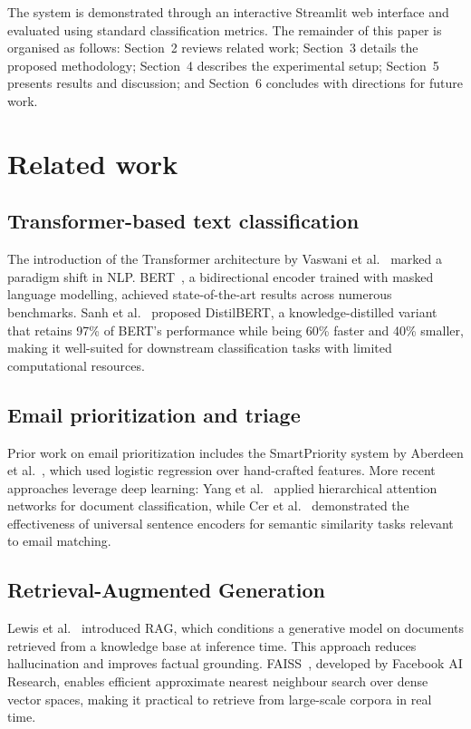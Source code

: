\documentclass[3p,times,procedia]{elsarticle}
\begin{document}
The system is demonstrated through an interactive Streamlit web interface and evaluated using standard classification metrics. The remainder of this paper is organised as follows: Section~2 reviews related work; Section~3 details the proposed methodology; Section~4 describes the experimental setup; Section~5 presents results and discussion; and Section~6 concludes with directions for future work.


\section{Related work}
\label{sec:related}

\subsection{Transformer-based text classification}

The introduction of the Transformer architecture by Vaswani et al.~\cite{vaswani2017} marked a paradigm shift in NLP. BERT~\cite{devlin2019}, a bidirectional encoder trained with masked language modelling, achieved state-of-the-art results across numerous benchmarks. Sanh et al.~\cite{sanh2019} proposed DistilBERT, a knowledge-distilled variant that retains 97\% of BERT's performance while being 60\% faster and 40\% smaller, making it well-suited for downstream classification tasks with limited computational resources.

\subsection{Email prioritization and triage}

Prior work on email prioritization includes the SmartPriority system by Aberdeen et al.~\cite{aberdeen2010}, which used logistic regression over hand-crafted features. More recent approaches leverage deep learning: Yang et al.~\cite{yang2017} applied hierarchical attention networks for document classification, while Cer et al.~\cite{cer2018} demonstrated the effectiveness of universal sentence encoders for semantic similarity tasks relevant to email matching.

\subsection{Retrieval-Augmented Generation}

Lewis et al.~\cite{lewis2020} introduced RAG, which conditions a generative model on documents retrieved from a knowledge base at inference time. This approach reduces hallucination and improves factual grounding. FAISS~\cite{johnson2019}, developed by Facebook AI Research, enables efficient approximate nearest neighbour search over dense vector spaces, making it practical to retrieve from large-scale corpora in real time.
\end{document}
